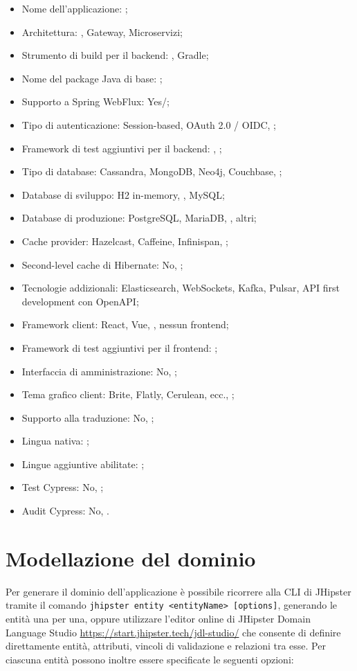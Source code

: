 \begin{itemize}
	\item Nome dell’applicazione: ;
	\item Architettura: , Gateway, Microservizi;
	\item Strumento di build per il backend: , Gradle;
	\item Nome del package Java di base: ;
	\item Supporto a Spring WebFlux: Yes/;
	\item Tipo di autenticazione: Session-based, OAuth 2.0 / OIDC, ;
	\item Framework di test aggiuntivi per il backend: , ;
	\item Tipo di database: Cassandra, MongoDB, Neo4j, Couchbase, ;
	\item Database di sviluppo: H2 in-memory, , MySQL;
	\item Database di produzione: PostgreSQL, MariaDB, , altri;
	\item Cache provider: Hazelcast, Caffeine, Infinispan, ;
	\item Second-level cache di Hibernate: No, ;
	\item Tecnologie addizionali: Elasticsearch, WebSockets, Kafka, Pulsar, API first development con OpenAPI;
	\item Framework client: React, Vue, , nessun frontend;
	\item Framework di test aggiuntivi per il frontend: ;
	\item Interfaccia di amministrazione: No, ;
	\item Tema grafico client: Brite, Flatly, Cerulean, ecc., ;
	\item Supporto alla traduzione: No, ;
	\item Lingua nativa: ;
	\item Lingue aggiuntive abilitate: ;
	\item Test Cypress: No, ;
	\item Audit Cypress: No, .
\end{itemize}

\section{Modellazione del dominio}
\label{sec:modellazione-dominio}
Per generare il dominio dell’applicazione è possibile ricorrere alla CLI di JHipster tramite il comando \texttt{jhipster entity <entityName> [options]}, generando le entità una per una, oppure utilizzare l’editor online di JHipster Domain Language Studio \url{https://start.jhipster.tech/jdl-studio/} che consente di definire direttamente entità, attributi, vincoli di validazione e relazioni tra esse. Per ciascuna entità possono inoltre essere specificate le seguenti opzioni:


